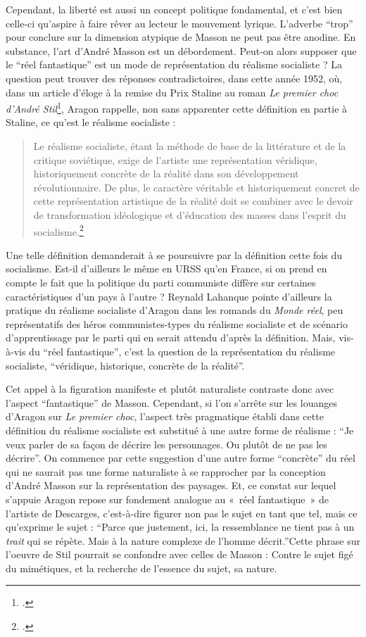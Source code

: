 	Cependant, la liberté est aussi un concept politique fondamental, et c’est bien celle-ci qu’aspire à faire rêver au lecteur le mouvement lyrique. L’adverbe \enquote{trop} pour conclure sur la dimension atypique de Masson ne peut pas être anodine. En substance, l’art d’André Masson est un débordement. Peut-on alors supposer que le \enquote{réel fantastique} est un mode de représentation du réalisme socialiste ? La question peut trouver des réponses contradictoires, dans cette année 1952, où, dans un article d’éloge à la remise du Prix Staline au roman \emph{Le premier choc d’André Stil}\footcite{prixstaline}, Aragon rappelle, non sans apparenter cette définition en partie à Staline, ce qu’est le réalisme socialiste : 
	\begin{quote}
	Le réalisme socialiste, étant la méthode de base de la littérature et de la critique soviétique, exige de l’artiste une représentation véridique, historiquement concrète de la réalité dans son développement révolutionnaire. De plus, le caractère véritable et historiquement concret de cette représentation artistique de la réalité doit se combiner avec le devoir de transformation idéologique et d’éducation des masses dans l’esprit du socialisme.\footcite{prixstaline}\end{quote}
	
	 Une telle définition demanderait à se poursuivre par la définition cette fois du socialisme. Est-il d’ailleurs le même en URSS qu’en France, si on prend en compte le fait que la politique du parti communiste diffère sur certaines caractéristiques d’un pays à l’autre ? Reynald Lahanque pointe d’ailleurs la pratique du réalisme socialiste d’Aragon dans les romands du \emph{Monde réel}, peu représentatifs des héros communistes-types du réalisme socialiste et de scénario d’apprentissage par le parti qui en serait attendu d’après la définition. Mais, vis-à-vis du \enquote{réel fantastique}, c’est la question de la représentation du réalisme socialiste, \enquote{véridique, historique, concrète de la réalité}.

 Cet appel à la figuration manifeste et plutôt naturaliste contraste donc avec l’aspect \enquote{fantastique} de Masson. Cependant, si l’on s’arrête sur les louanges d’Aragon sur \emph{Le premier choc}, l’aspect très pragmatique établi dans cette définition du réalisme socialiste est substitué à une autre forme de réalisme : \enquote{Je veux parler de sa façon de décrire les personnages. Ou plutôt de ne pas les décrire}. On commence par cette suggestion d’une autre forme \enquote{concrète} du réel qui ne saurait pas une forme naturaliste à se rapprocher par la conception d’André Masson sur la représentation des paysages. Et, ce constat sur lequel s’appuie Aragon repose sur fondement analogue au « réel fantastique » de l’artiste de Descarges, c’est-à-dire figurer non pas le sujet en tant que tel, mais ce qu’exprime le sujet : \enquote{Parce que justement, ici, la ressemblance ne tient  pas à un \emph{trait} qui se répète. Mais à la nature complexe de l’homme décrit.}Cette phrase sur l’oeuvre de Stil pourrait se confondre avec celles de Masson : Contre le sujet figé du mimétiques, et la recherche de l’essence du sujet, sa nature. 

